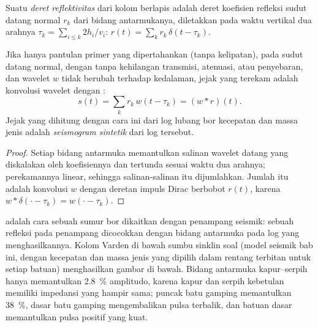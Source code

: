 \begin{definition}\label{def:b3:exploration-seismology:synthetic}
Suatu \emph{deret reflektivitas} dari kolom berlapis adalah
deret koefisien refleksi sudut datang normal $r_k$ dari bidang antarmukanya,
diletakkan pada waktu vertikal dua arahnya $\tau_k = \sum_{i \le k} 2h_i/v_i$:
$r(t) = \sum_k r_k\,\delta(t - \tau_k)$.
\end{definition}

\begin{proposition}\label{prop:b3:exploration-seismology:synthetic}
Jika hanya pantulan primer yang dipertahankan (tanpa kelipatan), pada sudut datang normal, dengan
tanpa kehilangan transmisi, atenuasi, atau penyebaran, dan wavelet $w$ tidak
berubah terhadap kedalaman, jejak yang terekam adalah konvolusi wavelet dengan
:
\[
  s(t) = \sum_k r_k\,w(t - \tau_k) = (w*r)(t) .
\]
Jejak yang dihitung dengan cara ini dari log lubang bor kecepatan dan massa jenis adalah
\emph{seismogram sintetik} dari log tersebut.
\end{proposition}

\begin{proof}
Setiap bidang antarmuka memantulkan salinan wavelet datang yang diskalakan oleh koefisiennya
dan tertunda sesuai waktu dua arahnya; perekamannya linear, sehingga salinan-salinan itu dijumlahkan.
Jumlah itu adalah konvolusi $w$ dengan deretan impuls Dirac berbobot
$r(t)$, karena $w*\delta(\cdot - \tau_k) = w(\cdot - \tau_k)$.
\end{proof}

 adalah cara sebuah sumur bor dikaitkan dengan penampang seismik: sebuah
refleksi pada penampang dicocokkan dengan bidang antarmuka pada log yang menghasilkannya.
Kolom Varden di bawah sumbu sinklin soal (model seismik bab ini,
dengan kecepatan dan massa jenis yang dipilih dalam rentang terbitan untuk
setiap batuan)
menghasilkan gambar di bawah. Bidang antarmuka kapur--serpih hanya memantulkan
\qty{2.8}{\percent} amplitudo, karena kapur dan serpih kebetulan memiliki
impedansi yang hampir sama; puncak batu gamping memantulkan \qty{38}{\percent},
dasar batu gamping mengembalikan pulsa terbalik, dan batuan dasar
memantulkan pulsa positif yang kuat.

